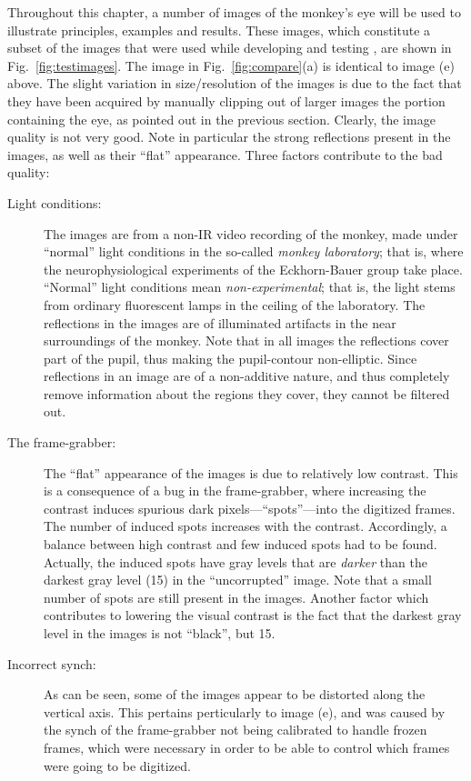 \noindent Throughout this chapter, a number of images of the monkey's
eye will be used to illustrate principles, examples and results.
These images, which constitute a subset of the images that were used
while developing and testing {\octopus}, are shown in
Fig.~\ref{fig:testimages}.  The image in Fig.~\ref{fig:compare}(a) is
identical to image (e) above.  The slight variation in size/resolution
of the images is due to the fact that they have been acquired by
manually clipping out of larger images the portion containing the eye,
as pointed out in the previous section.  Clearly, the image quality is
not very good.  Note in particular the strong reflections present in
the images, as well as their ``flat'' appearance.  Three factors
contribute to the bad quality:
\begin{description}
\item[Light conditions:] The images are from a non-IR video recording
  of the monkey, made under ``normal'' light conditions in the
  so-called {\em monkey laboratory\/}; that is, where the
  neurophysiological experiments of the Eckhorn-Bauer group take
  place.  ``Normal'' light conditions mean {\em non-experimental\/};
  that is, the light stems from ordinary fluorescent lamps in the
  ceiling of the laboratory.  The reflections in the images are of
  illuminated artifacts in the near surroundings of the monkey.  Note
  that in all images the reflections cover part of the pupil, thus
  making the pupil-contour non-elliptic.  Since reflections in an
  image are of a non-additive nature, and thus completely remove
  information about the regions they cover, they cannot be filtered
  out.
\item[The frame-grabber:] The ``flat'' appearance of the images is due
  to relatively low contrast.  This is a consequence of a bug in the
  frame-grabber, where increasing the contrast induces spurious dark
  pixels---``spots''---into the digitized frames.  The number of
  induced spots increases with the contrast.  Accordingly, a balance
  between high contrast and few induced spots had to be found.
  Actually, the induced spots have gray levels that are {\em darker\/}
  than the darkest gray level (15) in the ``uncorrupted'' image.  Note
  that a small number of spots are still present in the images.
  Another factor which contributes to lowering the visual contrast is
  the fact that the darkest gray level in the images is not ``black'',
  but 15.
\item[Incorrect synch:] As can be seen, some of the images appear to
  be distorted along the vertical axis.  This pertains perticularly to
  image (e), and was caused by the synch of the frame-grabber not
  being calibrated to handle frozen frames, which were necessary in
  order to be able to control which frames were going to be digitized.
\end{description}

